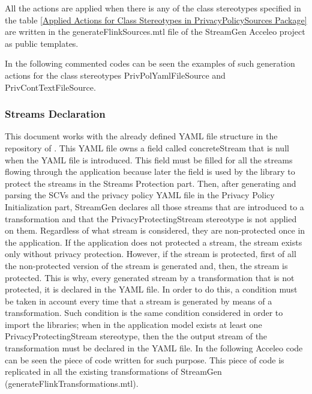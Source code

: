 All the actions are applied when there is any of the class stereotypes specified in the table \ref{Applied Actions for Class Stereotypes in PrivacyPolicySources Package} are written in the generateFlinkSources.mtl file of the StreamGen Acceleo project as public templates.

In the following commented codes can be seen the examples of such generation actions for the class stereotypes PrivPolYamlFileSource and PrivContTextFileSource.



\subsubsection{Streams Declaration}

This document works with the already defined YAML file structure in the repository of \cite{privacypoliciesarticle}. This YAML file owns a field called concreteStream that is null when the YAML file is introduced. This field must be filled for all the streams flowing through the application because later the field is used by the library to protect the streams in the Streams Protection part. Then, after generating and parsing the SCVs and the privacy policy YAML file in the Privacy Policy Initialization part, StreamGen declares all those streams that are introduced to a transformation and that the PrivacyProtectingStream stereotype is not applied on them. Regardless of what stream is considered, they are non-protected once in the application. If the application does not protected a stream, the stream exists only without privacy protection. However, if the stream is protected, first of all the non-protected version of the stream is generated and, then, the stream is protected. This is why, every generated stream by a transformation that is not protected, it is declared in the YAML file. In order to do this, a condition must be taken in account every time that a stream is generated by means of a transformation. Such condition is the same condition considered in order to import the libraries; when in the application model exists at least one PrivacyProtectingStream stereotype, then the the output stream of the transformation must be declared in the YAML file. In the following Acceleo code can be seen the piece of code written for such purpose. This piece of code is replicated in all the existing transformations of StreamGen (generateFlinkTransformations.mtl).



